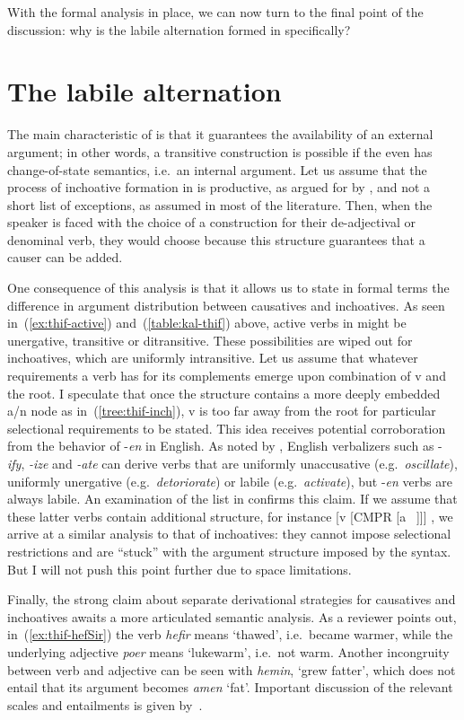 With the formal analysis in place, we can now turn to the final point of the discussion: why is the labile alternation formed in {\thif} specifically?


\section{The labile alternation}
The main characteristic of {\vd} is that it guarantees the availability of an external argument; in other words, a transitive construction is possible if the even has change-of-state semantics, i.e.~an internal argument. Let us assume that the process of inchoative formation in {\thif} is productive, as argued for by \cite{lev16}, and not a short list of exceptions, as assumed in most of the literature. Then, when the speaker is faced with the choice of a construction for their de-adjectival or denominal verb, they would choose {\vd} because this structure guarantees that a causer can be added.

One consequence of this analysis is that it allows us to state in formal terms the difference in argument distribution between causatives and inchoatives. As seen in~(\ref{ex:thif-active}) and~(\ref{table:kal-thif}) above, active verbs in {\thif} might be unergative, transitive or ditransitive. These possibilities are wiped out for inchoatives, which are uniformly intransitive. Let us assume that whatever requirements a verb has for its complements emerge upon combination of v and the root. I speculate that once the structure contains a more deeply embedded a/n node as in~(\ref{tree:thif-inch}), v is too far away from the root for particular selectional requirements to be stated. This idea receives potential corroboration from the behavior of -\emph{en} in English. As noted by \cite{harley09n}, English verbalizers such as -\emph{ify}, \emph{-ize} and \emph{-ate} can derive verbs that are uniformly unaccusative (e.g.~\emph{oscillate}), uniformly unergative (e.g.~\emph{detoriorate}) or labile (e.g.~\emph{activate}), but -\emph{en} verbs are always labile. An examination of the list in \citet[245]{levin93} confirms this claim. If we assume that these latter verbs contain additional structure, for instance [v [CMPR [a ~\!]]] \citep{bobaljik12}, we arrive at a similar analysis to that of {\thif} inchoatives: they cannot impose selectional restrictions and are ``stuck'' with the argument structure imposed by the syntax. But I will not push this point further due to space limitations.

Finally, the strong claim about separate derivational strategies for causatives and inchoatives awaits a more articulated semantic analysis. As a reviewer points out, in~(\ref{ex:thif-hefSir}) the verb \emph{hefir} means `thawed', i.e.~became warmer, while the underlying adjective \emph{poer} means `lukewarm', i.e.~not warm. Another incongruity between verb and adjective can be seen with \emph{hemin}, `grew fatter', which does not entail that its argument becomes \emph{amen} `fat'. Important discussion of the relevant scales and entailments is given by~\cite{borer91}.


